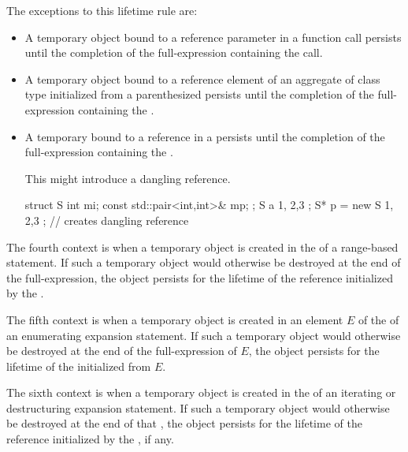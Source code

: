 The exceptions to this lifetime rule are:
\begin{itemize}
\item A temporary object bound to a reference parameter in a function call
persists until the completion of the full-expression containing the call.

\item A temporary object bound to a reference element of
an aggregate of class type initialized from
a parenthesized 
persists until the completion of the full-expression
containing the .

\item A temporary bound to a reference in a  persists until the completion of the full-expression containing the .
\begin{note}
This might introduce a dangling reference.
\end{note}
\begin{example}
\begin{codeblock}
struct S { int mi; const std::pair<int,int>& mp; };
S a { 1, {2,3} };
S* p = new S{ 1, {2,3} };       // creates dangling reference
\end{codeblock}
\end{example}
\end{itemize}

\pnum
The fourth context is when a temporary object
is created in the  of
a range-based  statement.
If such a temporary object would otherwise be destroyed
at the end of the  full-expression,
the object persists for the lifetime of the reference
initialized by the .

\pnum
The fifth context is when a temporary object is created in an element $E$
of the 
of an enumerating expansion statement.
If such a temporary object would otherwise be destroyed
at the end of the full-expression of $E$,
the object persists for the lifetime of the 
initialized from $E$.

\pnum
The sixth context is when a temporary object is created
in the 
of an iterating or destructuring expansion statement.
If such a temporary object would otherwise be destroyed
at the end of that ,
the object persists for the lifetime of the reference
initialized by the , if any.


